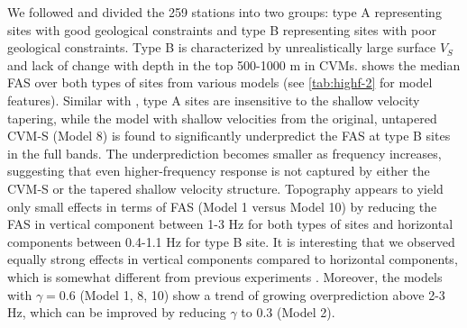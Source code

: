 We followed \citet{huCalibrationNearsurfaceSeismic2021} and divided the 259 stations into two groups: type A representing sites with good geological constraints and type B representing sites with poor geological constraints. Type B is characterized by unrealistically large surface $V_S$ and lack of change with depth in the top 500-1000 m in CVMs.  shows the median FAS over both types of sites from various models (see \cref{tab:highf-2} for model features). Similar with \citet{huCalibrationNearsurfaceSeismic2021}, type A sites are insensitive to the shallow velocity tapering, while the model with shallow velocities from the original, untapered CVM-S (Model 8) is found to significantly underpredict the FAS at type B sites in the full bands. The underprediction becomes smaller as frequency increases, suggesting that even higher-frequency response is not captured by either the CVM-S or the tapered shallow velocity structure. Topography appears to yield only small effects in terms of FAS (Model 1 versus Model 10) by reducing the FAS in vertical component between 1-3 Hz for both types of sites and horizontal components between 0.4-1.1 Hz for type B site. It is interesting that we observed equally strong effects in vertical components compared to horizontal components, which is somewhat different from previous experiments \citep[][and the references therein]{massaOverviewTopographicEffects2014}. Moreover, the models with $\gamma=0.6$ (Model 1, 8, 10) show a trend of growing overprediction above 2-3 Hz, which can be improved by reducing $\gamma$ to 0.3 (Model 2).


